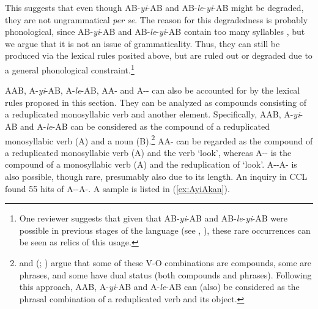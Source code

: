 This suggests that  even though AB-\textit{yi}-AB and AB-\textit{le}-\textit{yi}-AB might be degraded, they are not ungrammatical \textit{per se}.
The reason for this degradedness is probably phonological, since AB-\textit{yi}-AB and AB-\textit{le}-\textit{yi}-AB contain too many syllables \citetext{\citealp[274]{Fan1964}; \citealp[15]{Zhang2000}; \citealp[239]{YangWei2017}; \citealp[143]{Sui2018}}, but we argue that it is not an issue of grammaticality.
Thus, they can still be produced via the lexical rules posited above, but are ruled out or degraded due to a general phonological constraint.\footnote{
One reviewer suggests that given that AB-\textit{yi}-AB and AB-\textit{le}-\textit{yi}-AB were possible in previous stages of the language (see \citealt[15]{Zhang2000}, \citealt[160--161]{BascianoMelloni2017}),
these rare occurrences can be seen as relics of this usage.
}


AAB, A-\textit{yi}-AB, A-\textit{le}-AB, AA- and A-- can also be accounted for by the lexical rules proposed in this section.
They can be analyzed as compounds consisting of a reduplicated monosyllabic verb and another element.
Specifically, AAB, A-\textit{yi}-AB and A-\textit{le}-AB can be considered as the compound of a reduplicated monosyllabic verb (A) and a noun (B).\footnote{
    \citet[64--65]{Huang1984} and \citeauthor{Her1996} (\citeyear[Sec. 2]{Her1996}; \citeyear[Sec. 3.1]{Her2010}) argue that some of these V-O combinations are compounds, some are phrases, and some have dual status (both compounds and phrases).
    Following this approach, AAB, A-\textit{yi}-AB and A-\textit{le}-AB can (also) be considered as the phrasal combination of a reduplicated verb and its object.
}
AA- can be regarded as the compound of a reduplicated monosyllabic verb (A) and the verb  `look',
whereas A-- is the compound of a monosyllabic verb (A) and the reduplication of  `look'.
A--A- is also possible, though rare, presumably also due to its length.
An inquiry in CCL found 55 hits of A--A-.
A sample is listed in (\ref{ex:AyiAkan}).

